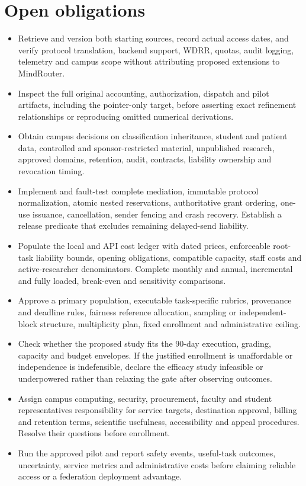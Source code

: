 \documentclass[11pt]{article}
\begin{document}
\section{Open obligations}
\begin{itemize}
\item Retrieve and version both starting sources, record actual access dates, and verify protocol translation, backend support, WDRR, quotas, audit logging, telemetry and campus scope without attributing proposed extensions to MindRouter.
\item Inspect the full original accounting, authorization, dispatch and pilot artifacts, including the pointer-only target, before asserting exact refinement relationships or reproducing omitted numerical derivations.
\item Obtain campus decisions on classification inheritance, student and patient data, controlled and sponsor-restricted material, unpublished research, approved domains, retention, audit, contracts, liability ownership and revocation timing.
\item Implement and fault-test complete mediation, immutable protocol normalization, atomic nested reservations, authoritative grant ordering, one-use issuance, cancellation, sender fencing and crash recovery. Establish a release predicate that excludes remaining delayed-send liability.
\item Populate the local and API cost ledger with dated prices, enforceable root-task liability bounds, opening obligations, compatible capacity, staff costs and active-researcher denominators. Complete monthly and annual, incremental and fully loaded, break-even and sensitivity comparisons.
\item Approve a primary population, executable task-specific rubrics, provenance and deadline rules, fairness reference allocation, sampling or independent-block structure, multiplicity plan, fixed enrollment and administrative ceiling.
\item Check whether the proposed study fits the 90-day execution, grading, capacity and budget envelopes. If the justified enrollment is unaffordable or independence is indefensible, declare the efficacy study infeasible or underpowered rather than relaxing the gate after observing outcomes.
\item Assign campus computing, security, procurement, faculty and student representatives responsibility for service targets, destination approval, billing and retention terms, scientific usefulness, accessibility and appeal procedures. Resolve their questions before enrollment.
\item Run the approved pilot and report safety events, useful-task outcomes, uncertainty, service metrics and administrative costs before claiming reliable access or a federation deployment advantage.
\end{itemize}
\end{document}
